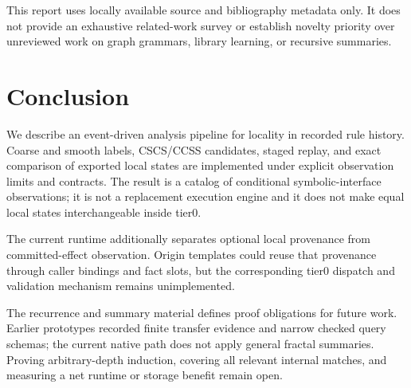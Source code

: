 \documentclass[11pt,a4paper]{article}
\begin{document}
This report uses locally available source and bibliography metadata only. It does
not provide an exhaustive related-work survey or establish novelty priority over
unreviewed work on graph grammars, library learning, or recursive summaries.

\section{Conclusion}
We describe an event-driven analysis pipeline for locality in recorded rule history. Coarse
and smooth labels, CSCS/CCSS candidates, staged replay, and exact comparison of
exported local states are implemented under explicit observation limits and contracts. The
result is a catalog of conditional symbolic-interface observations; it is not a
replacement execution engine and it does not make equal local states interchangeable
inside tier0.

The current runtime additionally separates optional local provenance from
committed-effect observation. Origin templates could reuse that provenance
through caller bindings and fact slots, but the corresponding tier0 dispatch
and validation mechanism remains unimplemented.

The recurrence and summary material defines proof obligations for future work. Earlier
prototypes recorded finite transfer evidence and narrow checked query schemas;
the current native path does not apply general fractal summaries. Proving
arbitrary-depth induction, covering all relevant internal matches, and measuring a
net runtime or storage benefit remain open.
\end{document}
